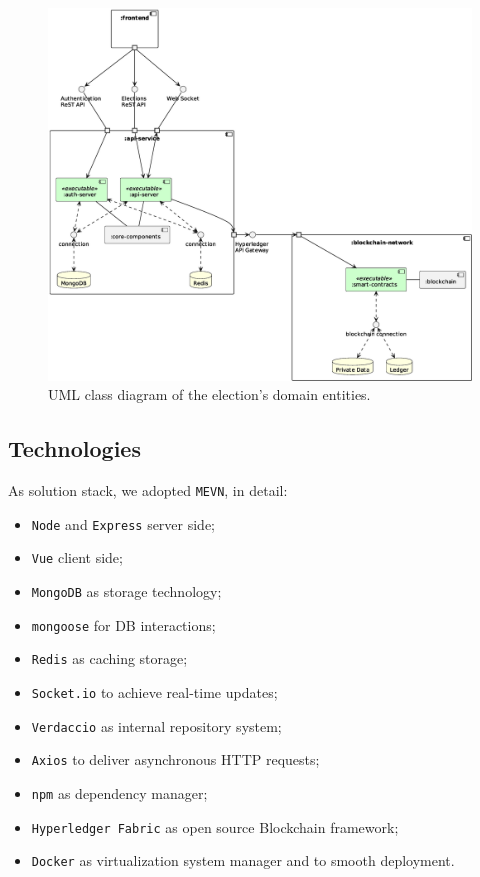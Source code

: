 \documentclass{scrartcl}
\begin{document}
\begin{landscape}
    \begin{figure}
        \centering
        \includegraphics[width=0.7\linewidth]{figures/system-architecture.eps}
        \caption{UML class diagram of the election's domain entities.}
        \label{fig:system-architecture} 
    \end{figure}
\end{landscape}
\restoregeometry

\subsection{Technologies}
\label{sec:technologies}

As solution stack, we adopted \texttt{MEVN}, in detail:
\begin{itemize}
    \item \texttt{Node} and \texttt{Express} server side;
    \item \texttt{Vue} client side;
    \item \texttt{MongoDB} as storage technology;
    \item \texttt{mongoose} for DB interactions;
    \item \texttt{Redis} as caching storage;
    \item \texttt{Socket.io} to achieve real-time updates;
    \item \texttt{Verdaccio} as internal repository system;
    \item \texttt{Axios} to deliver asynchronous HTTP requests;
    \item \texttt{npm} as dependency manager;
    \item \texttt{Hyperledger Fabric} as open source Blockchain framework;
    \item \texttt{Docker} as virtualization system manager and to smooth deployment.
\end{itemize}
\end{document}
